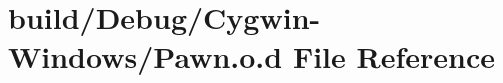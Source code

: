 \hypertarget{_cygwin-_windows_2_pawn_8o_8d}{}\section{build/\+Debug/\+Cygwin-\/\+Windows/\+Pawn.o.\+d File Reference}
\label{_cygwin-_windows_2_pawn_8o_8d}
